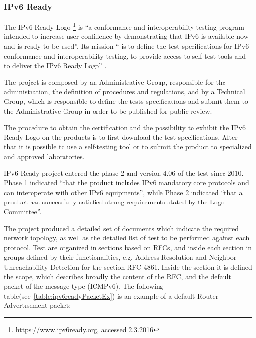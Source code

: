 \documentclass[12pt]{article}
\begin{document}
\subsubsection{IPv6 Ready}
\label{subsub:ipv6Ready}

The IPv6 Ready Logo \footnote{\url{https://www.ipv6ready.org}, accessed 2.3.2016} is ``a conformance and interoperability testing program intended to increase user confidence by demonstrating that IPv6 is available now and is ready to be used''. Its mission `` is to define the test specifications for IPv6 conformance and interoperability testing, to provide access to self-test tools and to deliver the IPv6 Ready Logo'' \cite{ipv6ready}.

The project is composed by an Administrative Group, responsible for the administration, the definition of procedures and regulations, and by a Technical Group, which is responsible to define the tests specifications and submit them to the Administrative Group in order to be published for public review.

The procedure to obtain the certification and the possibility to exhibit the IPv6 Ready Logo on the products is to first download the test specifications. After that it is possible to use a self-testing tool or to submit the product to specialized and approved laboratories.

IPv6 Ready project entered the phase 2 and version 4.06 of the test since 2010. Phase 1 indicated ``that the product includes IPv6 mandatory core protocols and can interoperate with other IPv6 equipments'', while Phase 2 indicated ``that a product has successfully satisfied strong requirements stated by the Logo Committee''.

The project produced a detailed set of documents\cite{ipv6readyCore}\cite{ipv6readyCore2} which indicate the required network topology, as well as the detailed list of test to be performed against each protocol. Test are organized in sections based on RFCs, and inside each section in groups defined by their functionalities, e.g. Address Resolution and Neighbor Unreachability Detection for the section RFC 4861. Inside the section it is defined the scope, which describes broadly the content of the RFC, and the default packet of the message type (ICMPv6). The following table(see~\ref{table:ipv6readyPacketEx}) is an example of a default Router Advertisement packet:
\end{document}
